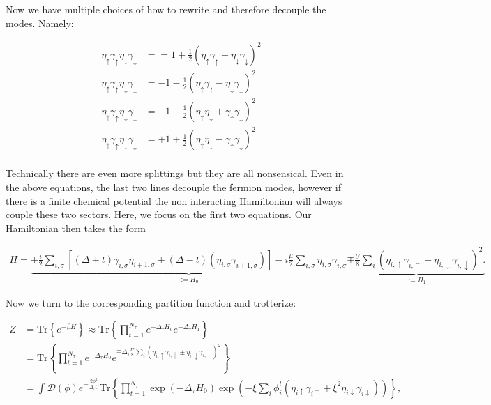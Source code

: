 \documentclass{article}
\begin{document}
Now we have multiple choices of how to rewrite and therefore decouple the modes. Namely:

\begin{align}
	\eta_{\uparrow}\gamma_{\uparrow}\eta_{\downarrow}\gamma_{\downarrow}   &=  =1 + \frac{1}{2} \left(\eta_{\uparrow}\gamma_{\uparrow} + \eta_{\downarrow}\gamma_{\downarrow} \right)^2 \\
	\eta_{\uparrow}\gamma_{\uparrow}\eta_{\downarrow}\gamma_{\downarrow}   &= -1 - \frac{1}{2} \left(\eta_{\uparrow}\gamma_{\uparrow} - \eta_{\downarrow}\gamma_{\downarrow} \right)^2 \\
	\eta_{\uparrow}\gamma_{\uparrow}\eta_{\downarrow}\gamma_{\downarrow}   &= -1 - \frac{1}{2} \left(\eta_\uparrow\eta_{\downarrow} +\gamma_{\uparrow}\gamma_\downarrow \right) ^2 \\
	\eta_{\uparrow}\gamma_{\uparrow}\eta_{\downarrow}\gamma_{\downarrow}   &= +1 + \frac{1}{2} \left(\eta_\uparrow\eta_{\downarrow} -\gamma_{\uparrow}\gamma_\downarrow \right) ^2 \\
\end{align}

Technically there are even more splittings but they are all nonsensical. Even in the above equations, the last two lines decouple the fermion modes, however if there is a finite chemical potential the non interacting Hamiltonian will always couple these two sectors. Here, we focus on the first two equations. Our Hamiltonian then takes the form

\begin{align}
	H = \underbrace{+\frac{i}{2}\sum_{i,\sigma}^{ } \left[\left(\Delta + t\right)  \gamma_{i,\sigma}\eta_{i+1,\sigma}   + \left(\Delta - t\right)  \left(\eta_{i,\sigma}\gamma_{i+1,\sigma} \right) \right] - i\frac{\mu}{2}\sum_{i,\sigma}^{ }\eta_{i,\sigma}\gamma_{i,\sigma}}_{:= H_0} \underbrace{\mp \frac{U}{8}\sum_{i}^{ } \left(\eta_{i,\uparrow}\gamma_{i,\uparrow} \pm \eta_{i,\downarrow}\gamma_{i,\downarrow} \right)^2.}_{:=H_1}
\end{align}

Now we turn to the corresponding partition function and trotterize:

\begin{align}
	Z &= \mathrm{Tr}\left\{e^{-\beta H} \right\} \approx \mathrm{Tr} \left\{\prod_{t=1}^{N_\tau}e^{-\Delta_\tau H_0} e^{-\Delta_\tau H_1}  \right\}\\
	&= \mathrm{Tr} \left\{\prod_{t=1}^{N_\tau}e^{-\Delta_\tau H_0}e^{ \mp \Delta_\tau \frac{U}{8}\sum_{i}^{ } \left(\eta_{i,\uparrow}\gamma_{i,\uparrow} \pm \eta_{i,\downarrow}\gamma_{i,\downarrow} \right)^2 }\right\}  \\
	&= \int_{ }^{ } \mathcal{D}\left(\phi\right)e^{-\frac{2\phi^{2} }{\Delta_\tau U}} \mathrm{Tr} \left\{\prod_{t=1}^{N_\tau} \exp \left( -\Delta_\tau H_0 \right) \exp \left( -\xi \sum_{i}^{ }\phi^{t}_{i} \left(\eta_{i\uparrow}\gamma_{i\uparrow} + \xi^2\eta_{i\downarrow}\gamma_{i\downarrow} \right)  \right)   \right\},
\end{align}
\end{document}
